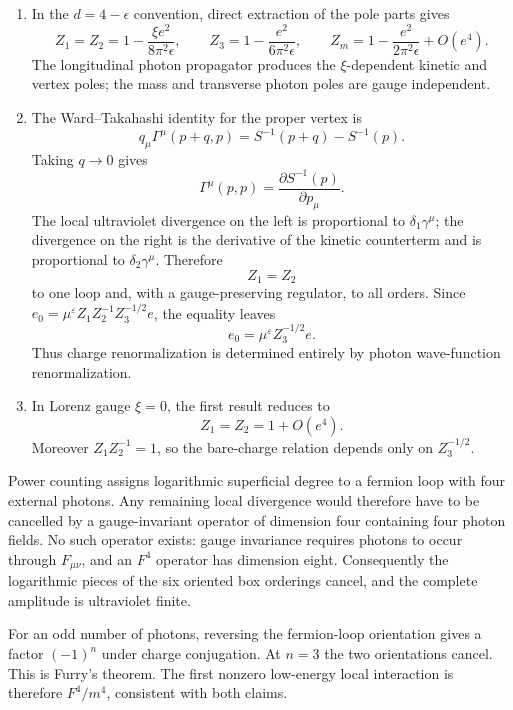 \begin{enumerate}
\begin{enumerate}
\item
In the \(d=4-\epsilon\) convention, direct extraction of the pole parts
gives
\[
 \boxed{
 Z_1=Z_2=1-\frac{\xi e^2}{8\pi^2\epsilon},\qquad
 Z_3=1-\frac{e^2}{6\pi^2\epsilon},\qquad
 Z_m=1-\frac{e^2}{2\pi^2\epsilon}}
 +O(e^4).
\]
The longitudinal photon propagator produces the \(\xi\)-dependent
kinetic and vertex poles; the mass and transverse photon poles are gauge
independent.
\item
The Ward--Takahashi identity for the proper vertex is
\[
 q_\mu\Gamma^\mu(p+q,p)
 =S^{-1}(p+q)-S^{-1}(p).
\]
Taking \(q\to0\) gives
\[
 \Gamma^\mu(p,p)=\frac{\partial S^{-1}(p)}{\partial p_\mu}.
\]
The local ultraviolet divergence on the left is proportional to
\(\delta_1\gamma^\mu\); the divergence on the right is the derivative of
the kinetic counterterm and is proportional to \(\delta_2\gamma^\mu\).
Therefore
\[
 \boxed{Z_1=Z_2}
\]
to one loop and, with a gauge-preserving regulator, to all orders.  Since
\(e_0=\mu^\varepsilon Z_1Z_2^{-1}Z_3^{-1/2}e\), the equality leaves
\[
 e_0=\mu^\varepsilon Z_3^{-1/2}e.
\]
Thus charge renormalization is determined entirely by photon
wave-function renormalization.
\item
In Lorenz gauge \(\xi=0\), the first result reduces to
\[
 Z_1=Z_2=1+O(e^4).
\]
Moreover \(Z_1Z_2^{-1}=1\), so the bare-charge relation depends only on
\(Z_3^{-1/2}\).
\end{enumerate}

Power counting assigns logarithmic superficial degree to a fermion loop with
four external photons.  Any remaining local divergence would therefore have
to be cancelled by a gauge-invariant operator of dimension four containing
four photon fields.  No such operator exists: gauge invariance requires
photons to occur through \(F_{\mu\nu}\), and an \(F^4\) operator has
dimension eight.  Consequently the logarithmic pieces of the six oriented
box orderings cancel, and the complete amplitude is ultraviolet finite.

For an odd number of photons, reversing the fermion-loop orientation gives
a factor \((-1)^n\) under charge conjugation.  At \(n=3\) the two
orientations cancel.  This is Furry's theorem.  The first nonzero
low-energy local interaction is therefore \(F^4/m^4\), consistent with both
claims.


\end{enumerate}
